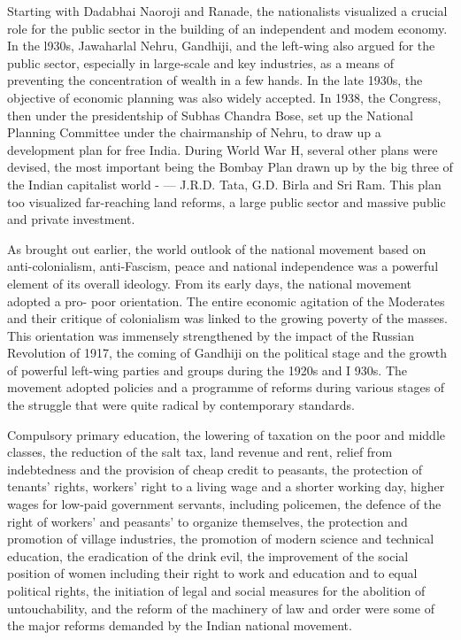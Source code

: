 Starting with Dadabhai Naoroji and Ranade, the nationalists visualized a crucial role for the public sector in the building of an independent and modem economy. In the l930s, Jawaharlal Nehru, Gandhiji, and the left-wing also argued for the public sector, especially in large-scale and key industries, as a means of preventing the concentration of wealth in a few hands. In the late 1930s, the objective of economic planning was also widely accepted. In 1938, the Congress, then under the presidentship of Subhas Chandra Bose, set up the National Planning Committee under the chairmanship of Nehru, to draw up a development plan for free India. During World War H, several other plans were devised, the most important being the Bombay Plan drawn up by the big three of the Indian capitalist world - --- J.R.D. Tata, G.D. Birla and Sri Ram. This plan too visualized far-reaching land reforms, a large public sector and massive public and private investment.

As brought out earlier, the world outlook of the national movement based on anti-colonialism, anti-Fascism, peace and national independence was a powerful element of its overall ideology. From its early days, the national movement adopted a pro- poor orientation. The entire economic agitation of the Moderates and their critique of colonialism was linked to the growing poverty of the masses. This orientation was immensely strengthened by the impact of the Russian Revolution of 1917, the coming of Gandhiji on the political stage and the growth of powerful left-wing parties and groups during the 1920s and I 930s. The movement adopted policies and a programme of reforms during various stages of the struggle that were quite radical by contemporary standards.

Compulsory primary education, the lowering of taxation on the poor and middle classes, the reduction of the salt tax, land revenue and rent, relief from indebtedness and the provision of cheap credit to peasants, the protection of tenants' rights, workers' right to a living wage and a shorter working day, higher wages for low-paid government servants, including policemen, the defence of the right of workers' and peasants' to organize themselves, the protection and promotion of village industries, the promotion of modern science and technical education, the eradication of the drink evil, the improvement of the social position of women including their right to work and education and to equal political rights, the initiation of legal and social measures for the abolition of untouchability, and the reform of the machinery of law and order were some of the major reforms demanded by the Indian national movement.

